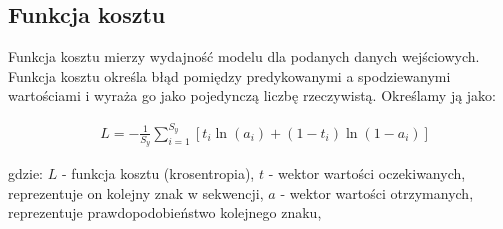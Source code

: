\subsection{Funkcja kosztu}
Funkcja kosztu mierzy wydajność modelu dla podanych danych wejściowych.
Funkcja kosztu określa błąd pomiędzy predykowanymi a spodziewanymi wartościami i wyraża go jako pojedynczą 
liczbę rzeczywistą. 
Określamy ją jako:

\begin{align*}
  &L = - \frac{1}{S_y}\sum_{i=1}^{S_y}[t_i\ln(a_i) + (1-t_i)\ln(1-a_i)]
\end{align*}

gdzie: \newline
$L$ - funkcja kosztu (krosentropia), \newline
$t$ - wektor wartości oczekiwanych, reprezentuje on kolejny znak w sekwencji, \newline
$a$ - wektor wartości otrzymanych, reprezentuje prawdopodobieństwo kolejnego znaku,  \newline
{}
